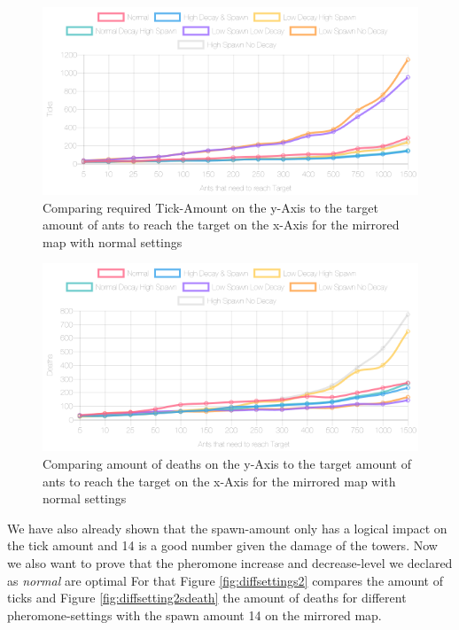 \begin{figure}[H]
  \centering
  \includegraphics[width=1\linewidth]{images/mirroredwithtower-ticks-line}
  \caption{Comparing required Tick-Amount on the y-Axis to the target amount of ants to reach the target on the x-Axis for the mirrored map with normal settings}
  \label{fig:diffsettings}
\end{figure}

\begin{figure}[H]
  \centering
  \includegraphics[width=1\linewidth]{images/mirroredwithtower-deaths-line}
  \caption{Comparing amount of deaths on the y-Axis to the target amount of ants to reach the target on the x-Axis for the mirrored map with normal settings}
  \label{fig:diffsettingsdeath}
\end{figure}

We have also already shown that the spawn-amount only has a logical impact on the tick amount and 14 is a good number given the damage of the towers. Now we also want to prove that the pheromone increase and decrease-level we declared as \textit{normal} are optimal
For that Figure \ref{fig:diffsettings2} compares the amount of ticks and Figure \ref{fig:diffsetting2sdeath} the amount of deaths for different pheromone-settings with the spawn amount 14 on the mirrored map.

